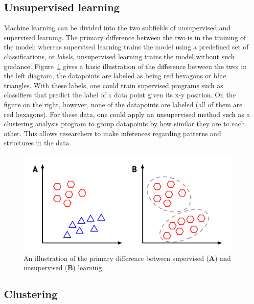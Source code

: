 \documentclass[12pt,oneside,onecolumn,a4paper]{article}
\begin{document}
\subsection{Unsupervised learning}

Machine learning can be divided into the two subfields of unsupervised and supervised learning. The primary difference between the two is in the training of the model: whereas supervised learning trains the model using a predefined set of classifications, or \textit{labels}, unsupervised learning trains the model without such guidance. Figure~\ref{fig:super} gives a basic illustration of the difference between the two:
in the left diagram, the datapoints are labeled as being red hexagons or blue triangles. With these labels, one could train supervised programs such as classifiers that predict the label of a data point given its x-y position. On the figure on the right, however, none of the datapoints are labeled (all of them are red hexagons). For these data, one could apply an unsupervised method such as a clustering analysis program to group datapoints by how similar they are to each other. This allows researchers to make inferences regarding patterns and structures in the data.

\begin{figure}[H]
\begin{center}
\includegraphics[width=0.8\columnwidth]{figures/learningtypes}
\caption{An illustration of the primary difference between supervised (\textbf{A}) and unsupervised (\textbf{B}) learning.\label{fig:super}
}
\end{center}
\end{figure}

\subsection{Clustering}
\end{document}
